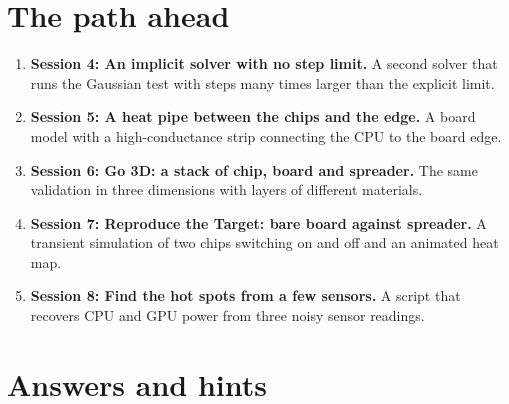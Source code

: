 \documentclass[11pt,a4paper]{article}
\begin{document}
\section{The path ahead}
\begin{enumerate}[nosep]
\item \textbf{Session 4: An implicit solver with no step limit.} A second solver that runs the Gaussian test with steps many times larger than the explicit limit.
\item \textbf{Session 5: A heat pipe between the chips and the edge.} A board model with a high-conductance strip connecting the CPU to the board edge.
\item \textbf{Session 6: Go 3D: a stack of chip, board and spreader.} The same validation in three dimensions with layers of different materials.
\item \textbf{Session 7: Reproduce the Target: bare board against spreader.} A transient simulation of two chips switching on and off and an animated heat map.
\item \textbf{Session 8: Find the hot spots from a few sensors.} A script that recovers CPU and GPU power from three noisy sensor readings.
\end{enumerate}

\section{Answers and hints}
\end{document}
